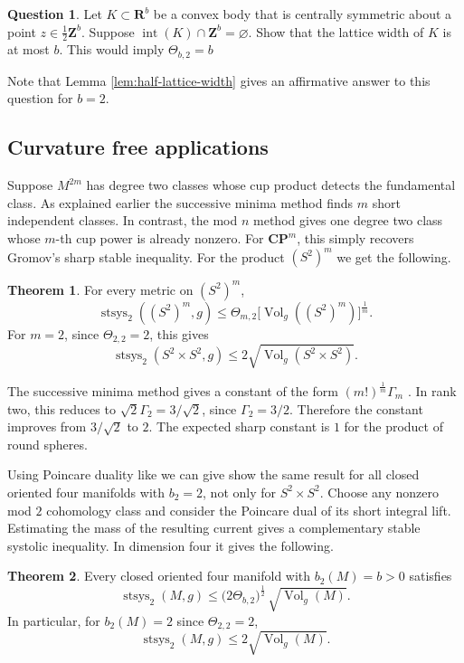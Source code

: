 \documentclass[11pt,reqno]{amsart}
\numberwithin{equation}{section}
\numberwithin{equation}{section}
\theoremstyle{definition}
\newtheorem{question}{Question}
\newtheorem{theorema}{Theorem}
\newcommand{\R}{\mathbf R}
\newcommand{\Z}{\mathbf Z}
\newcommand{\CP}{\mathbf{CP}}
\DeclareMathOperator{\Vol}{Vol}
\DeclareMathOperator{\stsys}{stsys}
\begin{document}
\begin{question}
    Let \(K\subset\R^b\) be a convex body that is centrally symmetric about a point \(z\in\frac12\Z^b\). Suppose \(\operatorname{int}(K)\cap\Z^b=\varnothing\). Show that the lattice width of \(K\) is at most \(b\). This would imply \(\Theta_{b,2}=b\)
\end{question}
Note that Lemma \ref{lem:half-lattice-width} gives an affirmative answer to this question for $b=2$.

\subsection{Curvature free applications}
Suppose \(M^{2m}\) has degree two classes whose cup product detects the fundamental class. As explained earlier the successive minima method finds \(m\) short independent classes. In contrast, the mod \(n\) method gives one degree two class whose \(m\)-th cup power is already nonzero. For \(\CP^m\), this simply recovers Gromov's sharp stable inequality. For the product \((S^2)^m\) we get the following. 

\begin{theorema} \label{thmA}
For every metric on \((S^2)^m\),
\[
\stsys_2((S^2)^m,g)
\le
\Theta_{m,2}\big[\Vol_g((S^2)^m)\big]^{\frac{1}{m}}.
\]
For \(m=2\), since \(\Theta_{2,2}=2\), this gives
\[
\stsys_2(S^2\times S^2,g)
\le
2\sqrt{\Vol_g(S^2\times S^2)}.
\]
\end{theorema}

The successive minima method gives a constant of the form \((m!)^{\frac{1}{m}}\Gamma_m\) \cite{GHK}. In rank two, this reduces to \(\sqrt2\Gamma_2=3/\sqrt{2}\), since \(\Gamma_2=3/2\)\cite{GHK}. Therefore the constant improves from \(3/\sqrt2\) to \(2\). The expected sharp constant is $1$ for the product of round spheres.

Using Poincare duality like \cite{hebda} we can give show the same result for all closed oriented four manifolds with \(b_2=2\), not only for \(S^2\times S^2\). Choose any nonzero mod \(2\) cohomology class and consider the Poincare dual of its short integral lift. Estimating the mass of the resulting current gives a complementary stable systolic inequality. In dimension four it gives the following.

\begin{theorema} \label{thmB}
Every closed oriented four manifold with \(b_2(M)=b>0\) satisfies
\[
\stsys_2(M,g)
\le
\big(2\Theta_{b,2}\big)^{\frac{1}{2}}\,\sqrt{\Vol_g(M)}.
\]
In particular, for \(b_2(M)=2\) since \(\Theta_{2,2}=2\),
\[
\stsys_2(M,g)
\le
2\sqrt{\Vol_g(M)}.
\]
\end{theorema}
\end{document}
